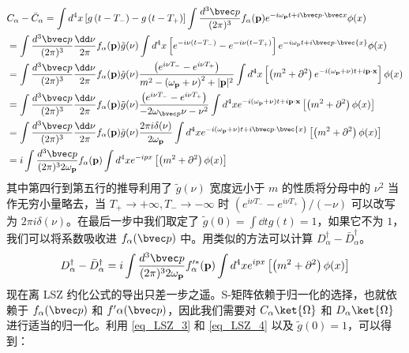 \begin{equation} \begin{aligned}
&C_\alpha-\bar{C}_\alpha=\int d^4  x\left[g\left(t-T_{-}\right)-g\left(t-T_{+}\right)\right] \int \frac{d^3 {\bvec p}}{(2 \pi)^3} f_\alpha(\mathbf{p}) e^{-i \omega_{\mathbf{p}} t+i \bvec p \cdot \bvec x} \phi(x)\\
&=\int \frac{d^3{\bvec p}}{(2 \pi)^3} \frac{\dd \nu}{2 \pi} f_\alpha(\mathbf{p}) \tilde{g}(\nu) \int d^4  x\left[e^{-i \nu\left(t-T_{-}\right)}-e^{-i \nu\left(t-T_{+}\right)}\right] e^{-i \omega_{\mathrm{p}} t+i \bvec p \cdot \bvec{x}} \phi(x)\\
&=\int \frac{d^3{\bvec p}}{(2 \pi)^3} \frac{\dd \nu}{2 \pi} f_\alpha(\mathbf{p}) \tilde{g}(\nu) \frac{\left(e^{i \nu T_{-}}-e^{i \nu T_{+}}\right)}{m^2-\left(\omega_{\mathbf{p}}+\nu\right)^2+|\mathbf{p}|^2} \int d^4  x\left[\left(m^2+\partial^2\right) e^{-i\left(\omega_{\mathbf{p}}+\nu\right) t+i \mathbf{p} \cdot \mathbf{x}}\right] \phi(x)\\
&=\int \frac{d^3{\bvec p}}{(2 \pi)^3} \frac{\dd \nu}{2 \pi} f_\alpha(\mathbf{p}) \tilde{g}(\nu) \frac{\left(e^{i \nu T_{-}}-e^{i\nu T_{+}}\right)}{-2\omega_{\bvec p}\nu - \nu^2} \int d^4  x e^{-i\left(\omega_{\mathbf{p}}+\nu\right) t+i \mathbf{p} \cdot \mathbf{x}}\left[\left(m^2+\partial^2\right) \phi(x)\right]\\
&=\int \frac{d^3{\bvec p}}{(2 \pi)^3} \frac{\dd \nu}{2 \pi} f_\alpha(\mathbf{p}) \tilde{g}(\nu) \frac{2 \pi i \delta(\nu)}{2 \omega_{\mathbf{p}}} \int d^4  x e^{-i\left(\omega_{\mathbf{p}}+\nu\right) t+i \bvec p \cdot \bvec{x}}\left[\left(m^2+\partial^2\right) \phi(x)\right]\\
&=i \int \frac{d^3{\bvec p}}{(2 \pi)^3 2 \omega_{\mathbf{p}}} f_\alpha(\mathbf{p}) \int d^4 x e^{-ipx}\left[\left(m^2+\partial^2\right) \phi(x)\right]
\end{aligned}\end{equation}
其中第四行到第五行的推导利用了 $\tilde{g}(\nu)$ 宽度远小于 $m$ 的性质将分母中的 $\nu^2$ 当作无穷小量略去，当 $T_+\rightarrow +\infty,T_-\rightarrow -\infty$ 时 $(e^{i\nu T_-}-e^{i\nu T_+})/(-\nu)$ 可以改写为 $2\pi i\delta(\nu)$。在最后一步中我们取定了 $\tilde g(0)=\int \dd{t} g(t)=1$，如果它不为 $1$，我们可以将系数吸收进 $f_\alpha(\bvec p)$ 中。用类似的方法可以计算 $D_\alpha^\dagger-\bar{D}_\alpha^\dagger$。
\[
D_\alpha^\dagger-\bar{D}_\alpha^\dagger=i \int \frac{d^3{\bvec p}}{(2 \pi)^3 2 \omega_{\mathbf{p}}} f'^{*}_\alpha(\mathbf{p}) \int d^4 x e^{ipx}\left[\left(m^2+\partial^2\right) \phi(x)\right]
\]
现在离 LSZ 约化公式的导出只差一步之遥。S-矩阵依赖于归一化的选择，也就依赖于 $f_\alpha(\bvec p)$ 和 $f'\alpha(\bvec p)$，因此我们需要对 $C_\alpha\ket{\Omega}$ 和 $D_\alpha\ket{\Omega}$ 进行适当的归一化。利用 \autoref{eq_LSZ_3}  和 \autoref{eq_LSZ_4}  以及 $\tilde g(0)=1$，可以得到：
